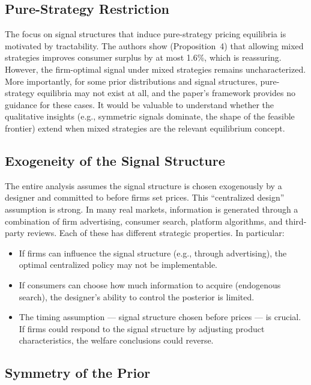 \documentclass[12pt, a4paper]{article}
\begin{document}
\subsection{Pure-Strategy Restriction}

The focus on signal structures that induce pure-strategy pricing equilibria is motivated by tractability. The authors show (Proposition~4) that allowing mixed strategies improves consumer surplus by at most 1.6\%, which is reassuring. However, the firm-optimal signal under mixed strategies remains uncharacterized. More importantly, for some prior distributions and signal structures, pure-strategy equilibria may not exist at all, and the paper's framework provides no guidance for these cases. It would be valuable to understand whether the qualitative insights (e.g., symmetric signals dominate, the shape of the feasible frontier) extend when mixed strategies are the relevant equilibrium concept.

\subsection{Exogeneity of the Signal Structure}

The entire analysis assumes the signal structure is chosen exogenously by a designer and committed to before firms set prices. This ``centralized design'' assumption is strong. In many real markets, information is generated through a combination of firm advertising, consumer search, platform algorithms, and third-party reviews. Each of these has different strategic properties. In particular:
\begin{itemize}[nosep]
    \item If firms can influence the signal structure (e.g., through advertising), the optimal centralized policy may not be implementable.
    \item If consumers can choose how much information to acquire (endogenous search), the designer's ability to control the posterior is limited.
    \item The timing assumption --- signal structure chosen before prices --- is crucial. If firms could respond to the signal structure by adjusting product characteristics, the welfare conclusions could reverse.
\end{itemize}

\subsection{Symmetry of the Prior}
\end{document}
